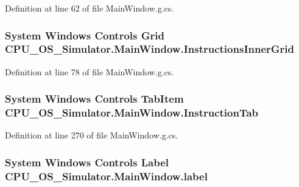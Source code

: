 Definition at line 62 of file Main\+Window.\+g.\+cs.

\hypertarget{class_c_p_u___o_s___simulator_1_1_main_window_a94a99eeb7f5fcfcfbdc375937d5439e7}{}
\subsubsection[{Instructions\+Inner\+Grid}]{\setlength{\rightskip}{0pt plus 5cm}System Windows Controls Grid C\+P\+U\+\_\+\+O\+S\+\_\+\+Simulator.\+Main\+Window.\+Instructions\+Inner\+Grid\hspace{0.3cm}{\ttfamily [package]}}\label{class_c_p_u___o_s___simulator_1_1_main_window_a94a99eeb7f5fcfcfbdc375937d5439e7}


Definition at line 78 of file Main\+Window.\+g.\+cs.

\hypertarget{class_c_p_u___o_s___simulator_1_1_main_window_a4fe9f6d97eb1f2c45b9e5a0363e61557}{}
\subsubsection[{Instruction\+Tab}]{\setlength{\rightskip}{0pt plus 5cm}System Windows Controls Tab\+Item C\+P\+U\+\_\+\+O\+S\+\_\+\+Simulator.\+Main\+Window.\+Instruction\+Tab\hspace{0.3cm}{\ttfamily [package]}}\label{class_c_p_u___o_s___simulator_1_1_main_window_a4fe9f6d97eb1f2c45b9e5a0363e61557}


Definition at line 270 of file Main\+Window.\+g.\+cs.

\hypertarget{class_c_p_u___o_s___simulator_1_1_main_window_ad60038602dcf5d954e420bee89c8494d}{}
\subsubsection[{label}]{\setlength{\rightskip}{0pt plus 5cm}System Windows Controls Label C\+P\+U\+\_\+\+O\+S\+\_\+\+Simulator.\+Main\+Window.\+label\hspace{0.3cm}{\ttfamily [package]}}\label{class_c_p_u___o_s___simulator_1_1_main_window_ad60038602dcf5d954e420bee89c8494d}



